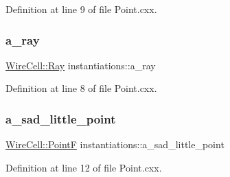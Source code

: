 Definition at line 9 of file Point.\+cxx.

\mbox{\label{namespaceinstantiations_a65f11b4e7eaa231ca9192beb9c2b918c}} 
\subsubsection{\texorpdfstring{a\+\_\+ray}{a\_ray}}
{\footnotesize\ttfamily \hyperlink{namespace_wire_cell_a3ab20d9b438feb7eb1ffaab9ba98af0c}{Wire\+Cell\+::\+Ray} instantiations\+::a\+\_\+ray}



Definition at line 8 of file Point.\+cxx.

\mbox{\label{namespaceinstantiations_abf3fff824547455eab0d37c2ef3125ba}} 
\subsubsection{\texorpdfstring{a\+\_\+sad\+\_\+little\+\_\+point}{a\_sad\_little\_point}}
{\footnotesize\ttfamily \hyperlink{namespace_wire_cell_a5ec8176c29cc534839f348e55e50b7f1}{Wire\+Cell\+::\+PointF} instantiations\+::a\+\_\+sad\+\_\+little\+\_\+point}



Definition at line 12 of file Point.\+cxx.

